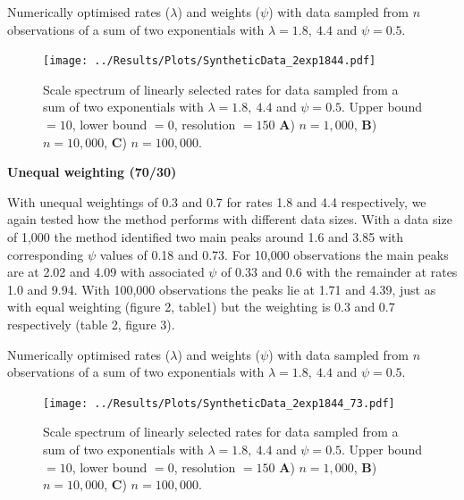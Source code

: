 \documentclass[11pt,usenames,dvipsnames,a4paper]{article}
\begin{document}
\begin{table}[H]
	\centering
	\caption{Numerically optimised rates ($\lambda$) and weights ($\psi$) with data sampled from $n$ observations of a sum of two exponentials with $\lambda = 1.8,\ 4.4$ and $\psi = 0.5$.}
	
\end{table}


\begin{figure}[H]
	\centering
	\texttt{[image: ../Results/Plots/SyntheticData\_2exp1844.pdf]}
	\caption{Scale spectrum of linearly selected rates for data sampled from a sum of two exponentials with $\lambda = 1.8,\ 4.4$ and $\psi = 0.5$. Upper bound $= 10$, lower bound $= 0$, resolution $= 150$ \textbf{A}) $n = 1,000$, \textbf{B}) $n = 10,000$,  \textbf{C}) $n = 100,000$.}
\end{figure}

\noindent
\textbf{Unequal weighting (70/30)}
\begin{linenumbers}

With unequal weightings of 0.3 and 0.7 for rates 1.8 and 4.4 respectively, we again tested how the method performs with different data sizes. With a data size of 1,000 the method identified two main peaks around 1.6 and 3.85 with corresponding $\psi$ values of 0.18 and 0.73. For 10,000 observations the main peaks are at 2.02 and 4.09 with associated $\psi$ of 0.33 and 0.6 with the remainder at rates 1.0 and 9.94. With 100,000 observations the peaks lie at 1.71 and 4.39, just as with equal weighting (figure 2, table1) but the weighting is 0.3 and 0.7 respectively (table 2, figure 3).
\end{linenumbers}
\begin{table}[H]
	\centering
	\caption{Numerically optimised rates ($\lambda$) and weights ($\psi$) with data sampled from $n$ observations of a sum of two exponentials with $\lambda = 1.8,\ 4.4$ and $\psi = 0.5$.}
	
\end{table}

\begin{figure}[H]
	\centering
	\texttt{[image: ../Results/Plots/SyntheticData\_2exp1844\_73.pdf]}
	\caption{Scale spectrum of linearly selected rates for data sampled from a sum of two exponentials with $\lambda = 1.8,\ 4.4$ and $\psi = 0.5$. Upper bound $= 10$, lower bound $= 0$, resolution $= 150$ \textbf{A}) $n = 1,000$, \textbf{B}) $n = 10,000$,  \textbf{C}) $n = 100,000$.}
\end{figure}
\end{document}
